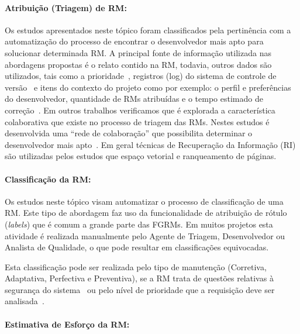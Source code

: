 \paragraph{Atribuição (Triagem) de RM:}

Os estudos apresentados neste tópico foram classificados pela pertinência com a
automatização do processo de encontrar o desenvolvedor mais apto para solucionar
determinada RM\@. A principal fonte de informação utilizada nas abordagens
propostas é o relato contido na RM, todavia, outros dados são utilizados, tais
como a prioridade~\cite{tian2015automated}, registros (log) do sistema de
controle de versão~\cite{shokripour2012automatic, Hu:2014:EBT:2707683.2708297} e
itens do contexto do projeto como por exemplo: o perfil e preferências do
desenvolvedor, quantidade de RMs atribuídas e o tempo estimado de
correção~\cite{hosseini2012market}. Em outros trabalhos verificamos que é
explorada a característica colaborativa que existe no processo de triagem das
RMs. Nestes estudos é desenvolvida uma ``rede de colaboração'' que possibilita
determinar o desenvolvedor mais apto~\cite{Zhang2014,Zanetti2013, Wu2011}.  Em
geral técnicas de Recuperação da Informação (RI) são utilizadas pelos estudos
que espaço vetorial e ranqueamento de páginas.

\paragraph{Classificação da RM:}

Os estudos neste tópico visam automatizar o processo de clas\-si\-fi\-ca\-ção
de uma RM\@.  Este tipo de abordagem faz uso da funcionalidade de atribuição de
rótulo (\textit{labels}) que é comum  a grande parte das FGRMs. Em muitos
projetos esta atividade é realizada manualmente pelo Agente de Triagem,
Desenvolvedor ou Analista de Qualidade, o que pode resultar em classificações
equivocadas.

Esta classificação pode ser realizada pelo tipo de manutenção (Corretiva,
Adaptativa, Perfectiva e Preventiva), se a RM trata de questões relativas à
segurança do sistema~\cite{gegick2010identifying, behl2014bug} ou pelo nível de
prioridade que a requisição deve ser analisada~\cite{behl2014bug}.

\paragraph{Estimativa de Esforço da RM:}

